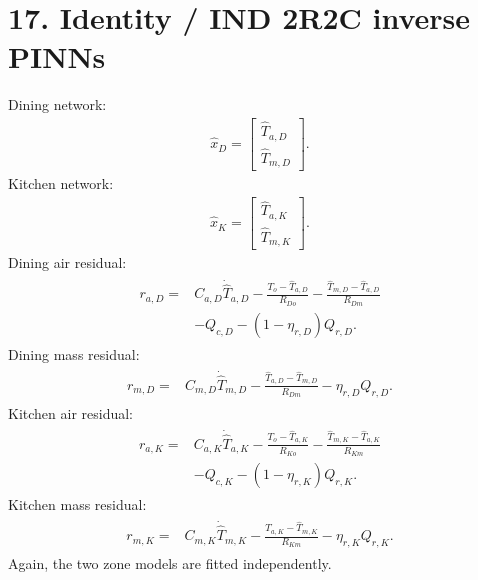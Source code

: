 \documentclass[11pt]{article}
\begin{document}
\section*{17. Identity / IND 2R2C inverse PINNs}
Dining network:
\begin{align}
\boxed{\widehat x_D=\begin{bmatrix}\widehat T_{a,D}\\\widehat T_{m,D}\end{bmatrix}.}
\tag{P2.74}
\end{align}
Kitchen network:
\begin{align}
\boxed{\widehat x_K=\begin{bmatrix}\widehat T_{a,K}\\\widehat T_{m,K}\end{bmatrix}.}
\tag{P2.75}
\end{align}
Dining air residual:
\begin{align}
\boxed{\begin{aligned}
r_{a,D}={}&C_{a,D}\dot{\widehat T}_{a,D}-\frac{T_o-\widehat T_{a,D}}{R_{Do}}-\frac{\widehat T_{m,D}-\widehat T_{a,D}}{R_{Dm}}\\
&-Q_{c,D}-(1-\eta_{r,D})Q_{r,D}.
\end{aligned}}
\tag{P2.76}
\end{align}
Dining mass residual:
\begin{align}
\boxed{\begin{aligned}
r_{m,D}={}&C_{m,D}\dot{\widehat T}_{m,D}-\frac{\widehat T_{a,D}-\widehat T_{m,D}}{R_{Dm}}-\eta_{r,D}Q_{r,D}.
\end{aligned}}
\tag{P2.77}
\end{align}
Kitchen air residual:
\begin{align}
\boxed{\begin{aligned}
r_{a,K}={}&C_{a,K}\dot{\widehat T}_{a,K}-\frac{T_o-\widehat T_{a,K}}{R_{Ko}}-\frac{\widehat T_{m,K}-\widehat T_{a,K}}{R_{Km}}\\
&-Q_{c,K}-(1-\eta_{r,K})Q_{r,K}.
\end{aligned}}
\tag{P2.78}
\end{align}
Kitchen mass residual:
\begin{align}
\boxed{\begin{aligned}
r_{m,K}={}&C_{m,K}\dot{\widehat T}_{m,K}-\frac{\widehat T_{a,K}-\widehat T_{m,K}}{R_{Km}}-\eta_{r,K}Q_{r,K}.
\end{aligned}}
\tag{P2.79}
\end{align}
Again, the two zone models are fitted independently.
\end{document}

